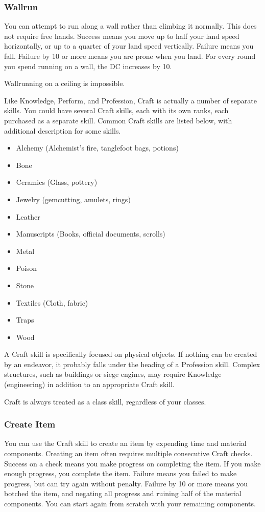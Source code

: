 \subsubsection{Wallrun}
You can attempt to run along a wall rather than climbing it normally. This does not require free hands. Success means you move up to half your land speed horizontally, or up to a quarter of your land speed vertically. Failure means you fall. Failure by 10 or more means you are prone when you land. For every round you spend running on a wall, the DC increases by 10.

Wallrunning on a ceiling is impossible.

Like Knowledge, Perform, and Profession, Craft is actually a number of separate skills. You could have several Craft skills, each with its own ranks, each purchased as a separate skill. Common Craft skills are listed below, with additional description for some skills.

\begin{itemize}
  \item Alchemy (Alchemist's fire, tanglefoot bags, potions)
  \item Bone
  \item Ceramics (Glass, pottery)
  \item Jewelry (gemcutting, amulets, rings)
  \item Leather
  \item Manuscripts (Books, official documents, scrolls)
  \item Metal
  \item Poison
  \item Stone
  \item Textiles (Cloth, fabric)
  \item Traps
  \item Wood
\end{itemize}

A Craft skill is specifically focused on physical objects. If nothing can be created by an endeavor, it probably falls under the heading of a Profession skill. Complex structures, such as buildings or siege engines, may require Knowledge (engineering) in addition to an appropriate Craft skill.

Craft is always treated as a class skill, regardless of your classes.

\subsubsection{Create Item}
You can use the Craft skill to create an item by expending time and material components. Creating an item often requires multiple consecutive Craft checks. Success on a check means you make progress on completing the item. If you make enough progress, you complete the item. Failure means you failed to make progress, but can try again without penalty. Failure by 10 or more means you botched the item, and negating all progress and ruining half of the material components. You can start again from scratch with your remaining components.

